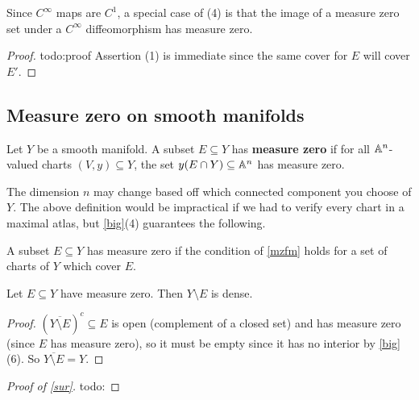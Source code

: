 Since $C^{\infty}$ maps are $C^1$, a special case of (4) is that the image of a measure zero set under a $C^{\infty} $ diffeomorphism has measure zero.
\begin{proof}
    {\color{red}todo:proof} 
    Assertion (1) is immediate since the same cover for $E$ will cover $E'$.
\end{proof}


\subsection{Measure zero on smooth manifolds}
\begin{definition}\label{mzfm}
    Let $Y$ be a smooth manifold. A subset $E \subseteq Y$ has \textbf{measure zero} if for all $\mathbb{A}^n $-valued charts $(V,y) \subseteq Y$, the set $y(E \cap Y) \subseteq \mathbb{A}^n $ has measure zero.
\end{definition}
The dimension $n$ may change based off which connected component you choose of $Y$. The above definition would be impractical if we had to verify every chart in a maximal atlas, but \cref{big}(4) guarantees the following.
\begin{prop}
    A subset $E \subseteq Y$ has measure zero if the condition of \cref{mzfm} holds for a set of charts of $Y$ which cover $E$.
\end{prop}
\begin{prop}
    Let $E \subseteq Y$ have measure zero. Then $Y \setminus E$ is dense.
\end{prop}
\begin{proof}
    $(\overline{Y \setminus E})^{c} \subseteq E$ is open (complement of a closed set) and has measure zero (since $E$ has measure zero), so it must be empty since it has no interior by \cref{big}(6). So $\overline{Y \setminus E}=Y$.
\end{proof}
\begin{proof}[Proof of \cref{sur}]
    {\color{red}todo:} 
\end{proof}

